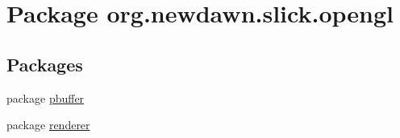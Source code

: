 \hypertarget{namespaceorg_1_1newdawn_1_1slick_1_1opengl}{}\section{Package org.\+newdawn.\+slick.\+opengl}
\label{namespaceorg_1_1newdawn_1_1slick_1_1opengl}
\subsection*{Packages}
\begin{DoxyCompactItemize}
\item 
package \mbox{\hyperlink{namespaceorg_1_1newdawn_1_1slick_1_1opengl_1_1pbuffer}{pbuffer}}
\item 
package \mbox{\hyperlink{namespaceorg_1_1newdawn_1_1slick_1_1opengl_1_1renderer}{renderer}}
\end{DoxyCompactItemize}
